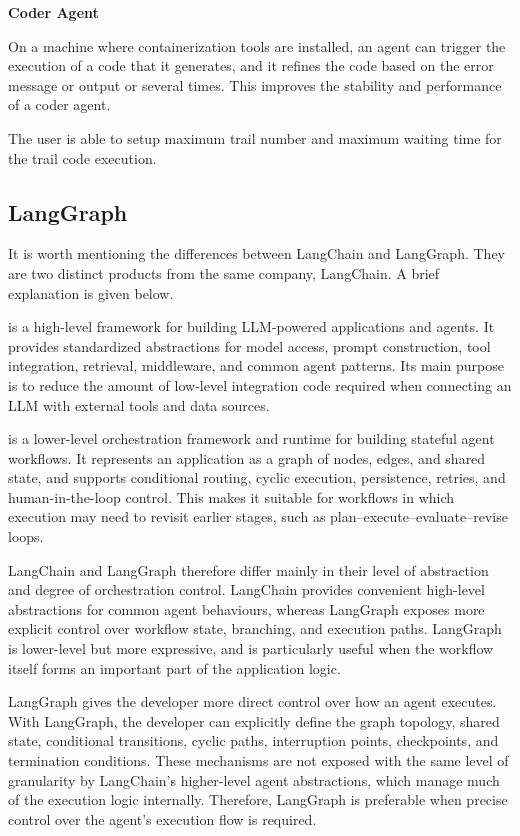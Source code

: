 \vspace{0.1in}
\noindent \textbf{Coder Agent}
\vspace{0.1in}

On a machine where containerization tools are installed, an agent can trigger the execution of a code that it generates, and it refines the code based on the error message or output or several times. This improves the stability and performance of a coder agent.

The user is able to setup maximum trail number and maximum waiting time for the trail code execution.

\subsection{LangGraph}

It is worth mentioning the differences between LangChain and LangGraph. They are two distinct products from the same company, LangChain. A brief explanation is given below.

 is a high-level framework for building LLM-powered applications and agents. It provides standardized abstractions for model access, prompt construction, tool integration, retrieval, middleware, and common agent patterns. Its main purpose is to reduce the amount of low-level integration code required when connecting an LLM with external tools and data sources.

 is a lower-level orchestration framework and runtime for building stateful agent workflows. It represents an application as a graph of nodes, edges, and shared state, and supports conditional routing, cyclic execution, persistence, retries, and human-in-the-loop control. This makes it suitable for workflows in which execution may need to revisit earlier stages, such as plan--execute--evaluate--revise loops.

LangChain and LangGraph therefore differ mainly in their level of abstraction and degree of orchestration control. LangChain provides convenient high-level abstractions for common agent behaviours, whereas LangGraph exposes more explicit control over workflow state, branching, and execution paths. LangGraph is lower-level but more expressive, and is particularly useful when the workflow itself forms an important part of the application logic.

LangGraph gives the developer more direct control over how an agent executes. With LangGraph, the developer can explicitly define the graph topology, shared state, conditional transitions, cyclic paths, interruption points, checkpoints, and termination conditions. These mechanisms are not exposed with the same level of granularity by LangChain's higher-level agent abstractions, which manage much of the execution logic internally. Therefore, LangGraph is preferable when precise control over the agent's execution flow is required.

